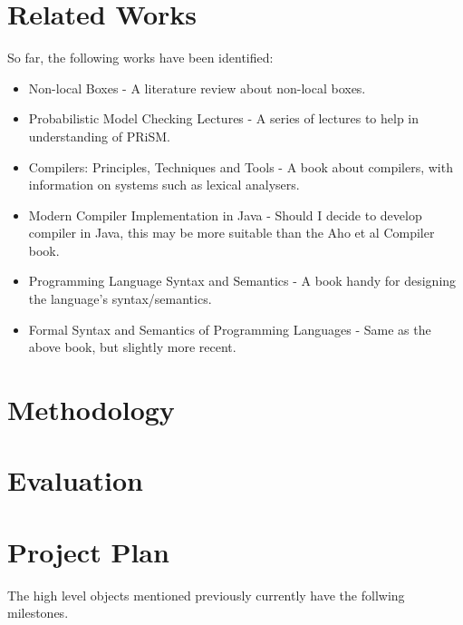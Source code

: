 \documentclass[11pt, a4paper]{article}
\begin{document}

\section{Related Works} %
\label{sec:related_works}
So far, the following works have been identified:
\begin{itemize}
    \item Non-local Boxes\cite{nlb_lamontague} - A literature review about
    non-local boxes.
    \item Probabilistic Model Checking Lectures\cite{prism_lectures} - A series
    of lectures to help in understanding of PRiSM.
    \item Compilers: Principles, Techniques and Tools\cite{dragon_compiler} - A
    book about compilers, with information on systems such as lexical analysers.
    \item Modern Compiler Implementation in Java\cite{java_compiler} - Should I
    decide to develop compiler in Java, this may be more suitable than the Aho 
    et al Compiler book.
    \item Programming Language Syntax and Semantics\cite{plss} - A book handy
    for designing the language's syntax/semantics.
    \item Formal Syntax and Semantics of Programming Languages\cite{fsspl} -
    Same as the above book, but slightly more recent.
\end{itemize}


\section{Methodology} %
\label{sec:methodology}


\section{Evaluation} %
\label{sec:evaluation}


\section{Project Plan} %
\label{sec:project_plan}
The high level objects mentioned previously currently have the follwing
milestones.
\end{document}
